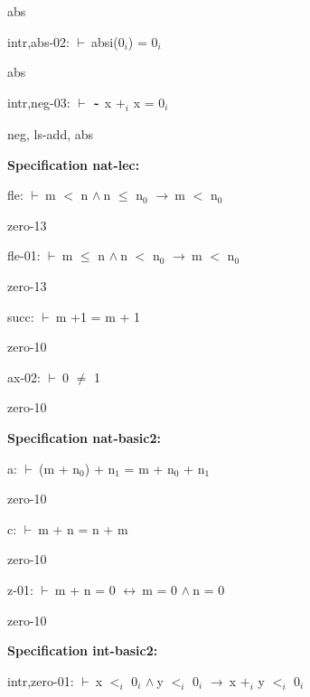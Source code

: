 \documentclass[a4paper]{article}
\newcommand{\tildesym}{\raisebox{-4pt}{\bf\~{}}}
\newcommand{\Fol}{\mbox{$\vdash\ $}}
\newcommand{\And}{\mbox{$\wedge\ $}}
\newcommand{\Imp}{\mbox{$\rightarrow\ $}}
\newcommand{\Equiv}{\mbox{$\leftrightarrow\ $}}
\begin{document}
abs

\bigskip

intr,abs-02: 
 \Fol absi($\mbox{0}_{i}$) = $\mbox{0}_{i}$



abs

\bigskip

intr,neg-03: 
 \Fol $\tildesym$ x $\mbox{+}_{i}$ x = $\mbox{0}_{i}$



neg, ls-add, abs

\bigskip

{\bf Specification nat-lec:}

fle: 
 \Fol m $<$ n \And n $\le$ $\mbox{n}_{0}$ \Imp m $<$ $\mbox{n}_{0}$



zero-13

\bigskip

fle-01: 
 \Fol m $\le$ n \And n $<$ $\mbox{n}_{0}$ \Imp m $<$ $\mbox{n}_{0}$



zero-13

\bigskip

succ: 
 \Fol m +1 = m + 1



zero-10

\bigskip

ax-02: 
 \Fol 0 $\neq$ 1



zero-10

\bigskip

{\bf Specification nat-basic2:}

a: 
 \Fol (m + $\mbox{n}_{0}$) + $\mbox{n}_{1}$ = m + $\mbox{n}_{0}$ + $\mbox{n}_{1}$



zero-10

\bigskip

c: 
 \Fol m + n = n + m



zero-10

\bigskip

z-01: 
 \Fol m + n = 0 \Equiv m = 0 \And n = 0



zero-10

\bigskip

{\bf Specification int-basic2:}

intr,zero-01: 
 \Fol x $\mbox{$<$}_{i}$ $\mbox{0}_{i}$ \And y $\mbox{$<$}_{i}$ $\mbox{0}_{i}$ \Imp x $\mbox{+}_{i}$ y $\mbox{$<$}_{i}$ $\mbox{0}_{i}$
\end{document}

